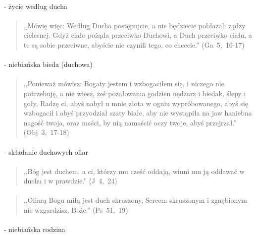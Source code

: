 \documentclass[10pt,a4paper,oneside]{article}
\begin{document}
\paragraph{}
- życie według ducha
\paragraph{}
\begin{quote}
,,Mówię więc: Według Ducha postępujcie, a nie będziecie pobłażali żądzy cielesnej. Gdyż ciało pożąda przeciwko Duchowi, a Duch przeciwko ciału, a te są sobie przeciwne, abyście nie czynili tego, co chcecie.'' \mbox{(Ga 5, 16-17)}
\end{quote}
\paragraph{}
- niebiańska bieda (duchowa)
\paragraph{}
\begin{quote}
,,Ponieważ mówisz: Bogaty jestem i wzbogaciłem się, i niczego nie potrzebuję, a nie wiesz, żeś pożałowania godzien nędzarz i biedak, ślepy i goły, Radzę ci, abyś nabył u mnie złota w ogniu wypróbowanego, abyś się wzbogacił i abyś przyodział szaty białe, aby nie wystąpiła na jaw haniebna nagość twoja, oraz maści, by nią namaścić oczy twoje, abyś przejrzał.'' \mbox{(Obj 3, 17-18)}
\end{quote}
\paragraph{}
- składanie duchowych ofiar
\paragraph{}
\begin{quote}
,,Bóg jest duchem, a ci, którzy mu cześć oddają, winni mu ją oddawać w duchu i w prawdzie.'' \mbox{(J 4, 24)}
\end{quote}
\paragraph{}
\begin{quote}
,,Ofiarą Bogu miłą jest duch skruszony, Sercem skruszonym i zgnębionym nie wzgardzisz, Boże.'' \mbox{(Ps 51, 19)}
\end{quote}
\paragraph{}
- niebiańska rodzina
\end{document}
